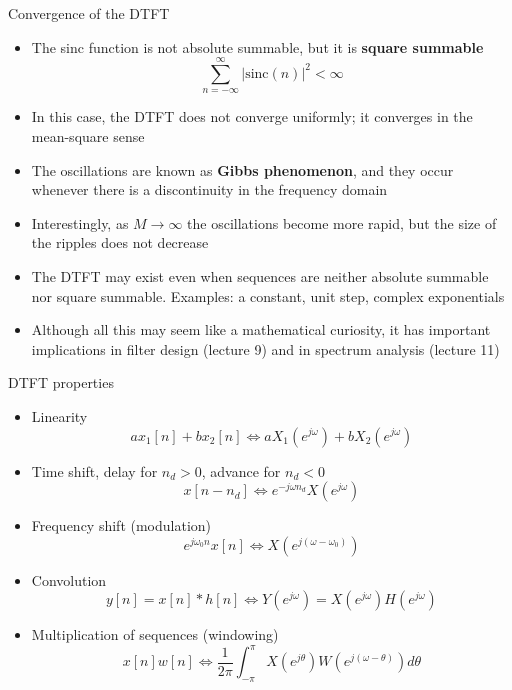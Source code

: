 \documentclass[10pt, aspectratio=169]{beamer}
\begin{document}
%
\begin{frame}{Convergence of the DTFT}
\begin{itemize}
	\item The sinc function is not absolute summable, but it is \textbf{square summable}
	\begin{equation*}
		\sum_{n=-\infty}^{\infty} |\mathrm{sinc}(n)|^2 < \infty
	\end{equation*}
	\item In this case, the DTFT does not converge uniformly; it converges in the mean-square sense
	\item The oscillations are known as \textbf{Gibbs phenomenon}, and they occur whenever there is a discontinuity in the frequency domain
	\item Interestingly, as $M\to\infty$ the oscillations become more rapid, but the size of the ripples does not decrease
	\item The DTFT may exist even when sequences are neither absolute summable nor square summable. Examples: a constant, unit step, complex exponentials
	\item Although all this may seem like a mathematical curiosity, it has important implications in filter design (lecture 9) and in spectrum analysis (lecture 11)
\end{itemize}
	
\end{frame}

%
\begin{frame}{DTFT properties}
\begin{itemize}
\item Linearity
	\begin{equation*}
	ax_1[n]  + bx_2[n] \Longleftrightarrow aX_1(e^{j\omega})+bX_2(e^{j\omega})
	\end{equation*}
\item Time shift, delay for $n_d > 0$, advance for $n_d < 0$
	\begin{equation*}
	x[n-n_d] \Longleftrightarrow e^{-j\omega n_d}X(e^{j\omega})
	\end{equation*}
\item Frequency shift (modulation)
	\begin{equation*}
	e^{j\omega_0n}x[n] \Longleftrightarrow X(e^{j(\omega-\omega_0)})
	\end{equation*}
\item Convolution
	\begin{equation*}
	y[n] = x[n]\ast h[n] \Longleftrightarrow Y(e^{j\omega}) = X(e^{j\omega})H(e^{j\omega})
	\end{equation*}
\item Multiplication of sequences (windowing)
	\begin{equation*}
	x[n]w[n] \Longleftrightarrow \frac{1}{2\pi}\int_{-\pi}^{\pi}X(e^{j\theta})W(e^{j(\omega-\theta)}){d\theta}
	\end{equation*}
\end{itemize}
\end{frame}
\end{document}
